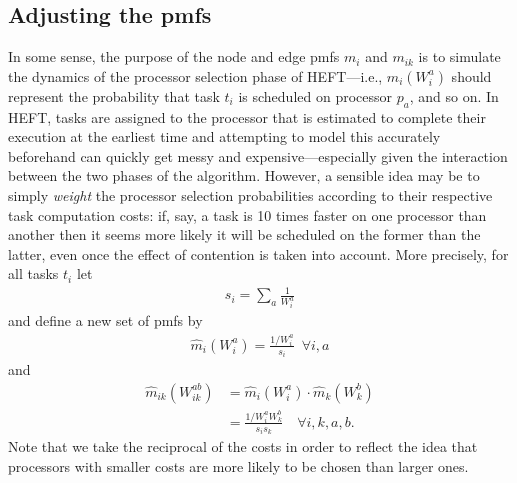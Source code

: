 \documentclass[12pt]{article}
\begin{document}



\subsection{Adjusting the pmfs}
\label{subsect.adjusting}

In some sense, the purpose of the node and edge pmfs $m_i$ and $m_{ik}$ is to simulate the dynamics of the processor selection phase of HEFT---i.e., $m_i(W_i^a)$ should represent the probability that task $t_i$ is scheduled on processor $p_a$, and so on. In HEFT, tasks are assigned to the processor that is estimated to complete their execution at the earliest time and attempting to model this accurately beforehand can quickly get messy and expensive---especially given the interaction between the two phases of the algorithm. However, a sensible idea may be to simply {\em weight} the processor selection probabilities according to their respective task computation costs: if, say, a task is 10 times faster on one processor than another then it seems more likely it will be scheduled on the former than the latter, even once the effect of contention is taken into account. More precisely, for all tasks $t_i$ let 
\begin{align*}
s_i = \sum_{a} \frac{1}{W_i^a}
\end{align*} 
and define a new set of pmfs by
\begin{align*}
\hat{m}_i(W_i^a) = \frac{1/W_i^a}{s_i} \enspace \forall i, a
\end{align*}
and 
\begin{align*}
\hat{m}_{ik}(W_{ik}^{ab}) &= \hat{m}_i(W_i^a) \cdot \hat{m}_k(W_k^b) \\
&= \frac{1/W_i^aW_k^b}{s_is_k} \quad \forall i, k, a, b.
\end{align*}
Note that we take the reciprocal of the costs in order to reflect the idea that processors with smaller costs are more likely to be chosen than larger ones.
\end{document}
